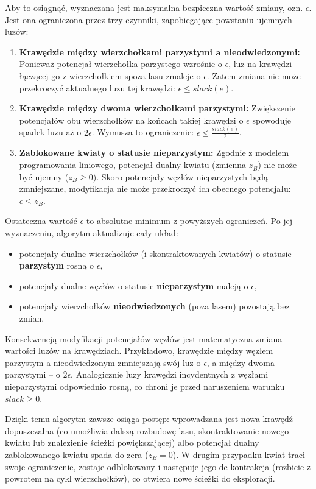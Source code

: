 \documentclass{article}
\theoremstyle{definition}
\theoremstyle{plain}
\theoremstyle{remark}
\begin{document}
Aby to osiągnąć, wyznaczana jest maksymalna bezpieczna wartość zmiany, ozn. $\epsilon$. Jest ona ograniczona przez trzy czynniki, zapobiegające powstaniu ujemnych luzów:
\begin{enumerate}
    \item \textbf{Krawędzie między wierzchołkami parzystymi a nieodwiedzonymi:} Ponieważ potencjał wierzchołka parzystego wzrośnie o $\epsilon$, luz na krawędzi łączącej go z wierzchołkiem spoza lasu zmaleje o $\epsilon$. Zatem zmiana nie może przekroczyć aktualnego luzu tej krawędzi: $\epsilon \le slack(e)$.
    \item \textbf{Krawędzie między dwoma wierzchołkami parzystymi:} Zwiększenie potencjałów obu wierzchołków na końcach takiej krawędzi o $\epsilon$ spowoduje spadek luzu aż o $2\epsilon$. Wymusza to ograniczenie: $\epsilon \le \frac{slack(e)}{2}$.
    \item \textbf{Zablokowane kwiaty o statusie nieparzystym:} Zgodnie z modelem programowania liniowego, potencjał dualny kwiatu (zmienna $z_B$) nie może być ujemny ($z_B \ge 0$). Skoro potencjały węzłów nieparzystych będą zmniejszane, modyfikacja nie może przekroczyć ich obecnego potencjału: $\epsilon \le z_B$.
\end{enumerate}

Ostateczna wartość $\epsilon$ to absolutne minimum z powyższych ograniczeń. Po jej wyznaczeniu, algorytm aktualizuje cały układ:
\begin{itemize}
    \item potencjały dualne wierzchołków (i skontraktowanych kwiatów) o statusie \textbf{parzystym} rosną o $\epsilon$,
    \item potencjały dualne węzłów o statusie \textbf{nieparzystym} maleją o $\epsilon$,
    \item potencjały wierzchołków \textbf{nieodwiedzonych} (poza lasem) pozostają bez zmian.
\end{itemize}

Konsekwencją modyfikacji potencjałów węzłów jest matematyczna zmiana wartości luzów na krawędziach. Przykładowo, krawędzie między węzłem parzystym a nieodwiedzonym zmniejszają swój luz o $\epsilon$, a między dwoma parzystymi -- o $2\epsilon$. Analogicznie luzy krawędzi incydentnych z węzłami nieparzystymi odpowiednio rosną, co chroni je przed naruszeniem warunku $slack \ge 0$.

Dzięki temu algorytm zawsze osiąga postęp: wprowadzana jest nowa krawędź dopuszczalna (co umożliwia dalszą rozbudowę lasu, skontraktowanie nowego kwiatu lub znalezienie ścieżki powiększającej) albo potencjał dualny zablokowanego kwiatu spada do zera ($z_B = 0$). W drugim przypadku kwiat traci swoje ograniczenie, zostaje odblokowany i następuje jego de-kontrakcja (rozbicie z powrotem na cykl wierzchołków), co otwiera nowe ścieżki do eksploracji.
\end{document}
